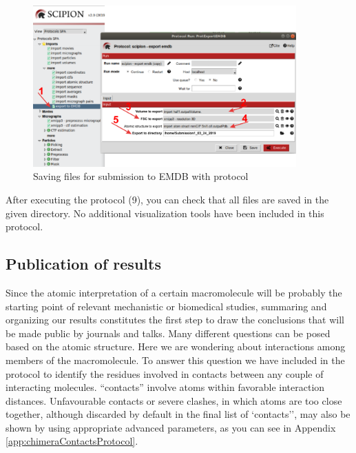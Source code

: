  \begin{figure}[H]
  \centering 
  \captionsetup{width=.7\linewidth} 
  \includegraphics[width=0.9\textwidth]{Images/Fig45}
  \caption{Saving files for submission to EMDB with protocol }
  \label{fig:export_to_EMDB_protocol}
  \end{figure}
  
After executing the protocol (9), you can check that all files are saved in the given directory. No additional visualization tools have been included in this protocol. 

\subsection*{Publication of results}

Since the atomic interpretation of a certain macromolecule will be probably the starting point of relevant mechanistic or biomedical studies, summaring and organizing our results constitutes the first step to draw the conclusions that will be made public by journals and talks. Many different questions can be posed based on the atomic structure. Here we are wondering about interactions among members of the macromolecule. To answer this question we have included in \scipion the protocol  to identify the residues involved in contacts between any couple of interacting molecules. ``contacts'' involve atoms within  favorable interaction distances. Unfavourable contacts or severe clashes, in which atoms are too close together, although discarded by default in the final list of `contacts'', may also be shown by using appropriate advanced parameters, as you can see in Appendix \ref{app:chimeraContactsProtocol}. \\

